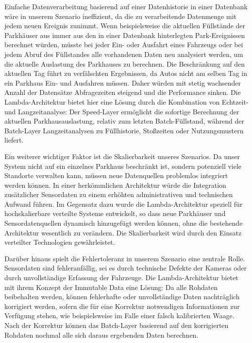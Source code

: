 Einfache Datenverarbeitung basierend auf einer Datenhistorie in einer Datenbank wäre in unserem Szenario ineffizient, da die zu verarbeitende Datenmenge mit jedem neuen Ereignis zunimmt.
Wenn beispielsweise die aktuellen Füllstände der Parkhäuser aus immer aus den in einer Datenbank hinterlegten Park-Ereignissen berechnet würden, müsste bei jeder Ein- oder Ausfahrt eines Fahrzeugs oder bei jedem Abruf des Füllstandes alle vorhandenen Daten neu analysiert werden, um die aktuelle Auslastung des Parkhauses zu berechnen.
Die Beschränkung auf den aktuellen Tag führt zu verfälschten Ergebnissen, da Autos nicht am selben Tag in ein Parkhaus Ein- und Ausfahren müssen.
Daher würden mit stetig wachsender Anzahl der Datensätze Abfragezeiten steigend und die Performance sinken.
Die Lambda-Architektur bietet hier eine Lösung durch die Kombination von Echtzeit- und Langzeitanalyse: Der Speed-Layer ermöglicht die sofortige Berechnung der aktuellen Parkhausauslastung, relativ zum letzten Batch-Füllstand, während der Batch-Layer Langzeitanalysen zu Füllhistorie, Stoßzeiten oder Nutzungsmustern liefert.

Ein weiterer wichtiger Faktor ist die Skalierbarkeit unseres Szenarios. Da unser System nicht auf ein einzelnes Parkhaus beschränkt ist, sondern potenziell viele Standorte verwalten kann, müssen neue Datenquellen problemlos integriert werden können. In einer herkömmlichen Architektur würde die Integration zusätzlicher Sensordaten zu einem erhöhten administrativen und technischen Aufwand führen. Im Gegensatz dazu wurde die Lambda-Architektur speziell für hochskalierbare verteilte Systeme entwickelt, so dass neue Parkhäuser und Sensordatenquellen dynamisch hinzugefügt werden können, ohne die bestehende Architektur wesentlich zu verändern. Die Skalierbarkeit wird durch den Einsatz verteilter Technologien gewährleistet.

Darüber hinaus spielt die Fehlertoleranz in unserem Szenario eine zentrale Rolle. Sensordaten sind fehleranfällig, sei es durch technische Defekte der Kameras oder durch unvollständige Erfassung der Fahrzeuge. Die Lambda-Architektur bietet mit ihrem Konzept der Immutable Data eine Lösung:
Da alle Rohdaten beibehalten werden, können fehlerhafte oder unvollständige Daten nachträglich korrigiert werden, sofern die für eine Korrektur notwendigen Informationen zur Verfügung stehen, wie beispielsweise im Falle einer falsch kalibrierten Waage.
Nach der Korrektur können das Batch-Layer basierend auf den korrigierten Rohdaten nochmal alle sich daraus ergebenden Daten berechnen.
